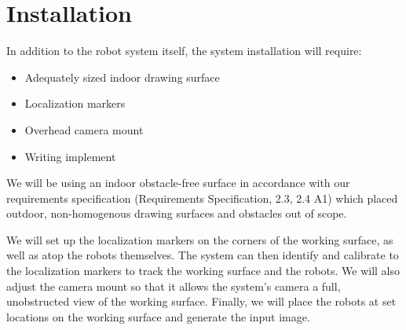 
\section{Installation}
\label{sec:install}

In addition to the robot system itself, the system installation will require:

\begin{itemize}
	\item Adequately sized indoor drawing surface
	\item Localization markers
	\item Overhead camera mount
	\item Writing implement
\end{itemize}

We will be using an indoor obstacle-free surface in accordance with our requirements specification (Requirements Specification, 2.3, 2.4 A1) which placed outdoor, non-homogenous drawing surfaces and obstacles out of scope. 

We will set up the localization markers on the corners of the working surface, as well as atop the robots themselves. The system can then identify and calibrate to the localization markers to track the working surface and the robots. We will also adjust the camera mount so that it allows the system's camera a full, unobstructed view of the working surface. Finally, we will place the robots at set locations on the working surface and generate the input image.
